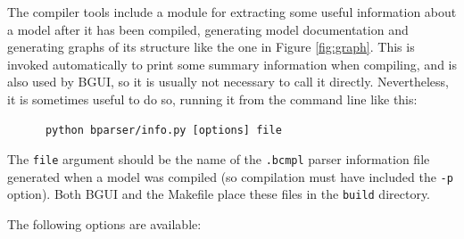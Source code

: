\documentclass[a4paper,11pt]{article}
\begin{document}
The compiler tools include a module for extracting some useful information about a model after it has been compiled, generating model documentation and generating graphs of its structure like the one in Figure \ref{fig:graph}. This is invoked automatically to print some summary information when compiling, and is also used by BGUI, so it is usually not necessary to call it directly. Nevertheless, it is sometimes useful to do so, running it from the command line like this:
\begin{verbatim}
      python bparser/info.py [options] file
\end{verbatim}
The \texttt{file} argument should be the name of the \texttt{.bcmpl} parser information file generated when a model was compiled (so compilation must have included the \texttt{-p} option). Both BGUI and the Makefile place these files in the \texttt{build} directory.

The following options are available:
\end{document}
